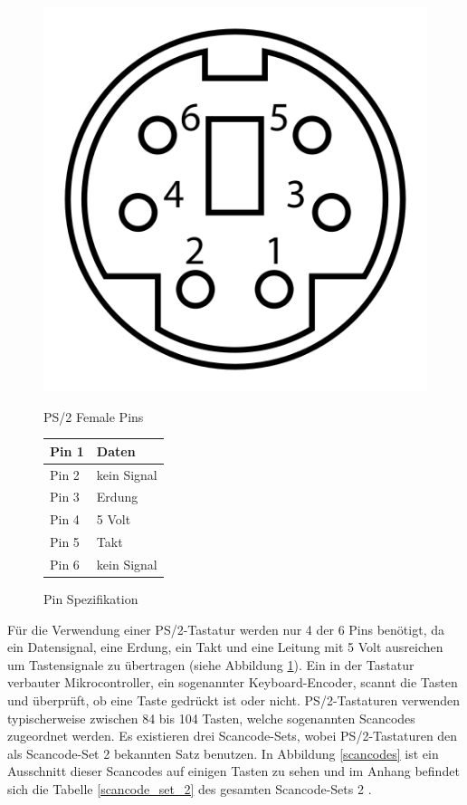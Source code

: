 \begin{figure}
  \centering
  \begin{minipage}{0.45\textwidth}
    \centering
    \includegraphics[width=0.48\linewidth]{images/female_pins.png}
    \caption{PS/2 Female Pins}
    \label{female_pins}
  \end{minipage}
  \begin{minipage}{0.45\textwidth}
    \centering
    \begin{tabular}{|l|l|} \hline
      Pin 1 & Daten \\ \hline
      Pin 2 & kein Signal \\ \hline
      Pin 3 & Erdung \\ \hline
      Pin 4 & 5 Volt \\ \hline
      Pin 5 & Takt \\ \hline
      Pin 6 & kein Signal \\ \hline
    \end{tabular}
    \caption{Pin Spezifikation}
    \label{pin_specification}
  \end{minipage}
\end{figure}

Für die Verwendung einer PS/2-Tastatur werden nur 4 der 6 Pins benötigt, da ein Datensignal, eine Erdung, ein Takt und eine Leitung mit 5 Volt ausreichen um Tastensignale zu übertragen (siehe Abbildung \ref{pin_specification}). Ein in der Tastatur verbauter Mikrocontroller, ein sogenannter Keyboard-Encoder, scannt die Tasten und überprüft, ob eine Taste gedrückt ist oder nicht. PS/2-Tastaturen verwenden typischerweise zwischen 84 bis 104 Tasten, welche sogenannten Scancodes zugeordnet werden. Es existieren drei Scancode-Sets, wobei PS/2-Tastaturen den als Scancode-Set 2 bekannten Satz benutzen. In Abbildung \ref{scancodes} \cite{scancodes} ist ein Ausschnitt dieser Scancodes auf einigen Tasten zu sehen und im Anhang befindet sich die Tabelle \ref{scancode_set_2} des gesamten Scancode-Sets 2 \cite{chapweske} \cite{mock}.

